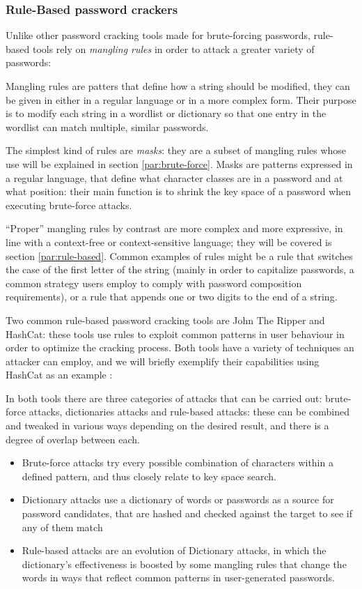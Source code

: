 \subsubsection{Rule-Based password crackers} \label{hash_and_jtr}
Unlike other password cracking tools made for brute-forcing passwords, rule-based tools rely on \emph{mangling rules} in order to attack a greater variety of passwords:

Mangling rules are patters that define how a string should be modified, they can be given in either in a regular language or in a more complex form.
Their purpose is to modify each string in a wordlist or dictionary so that one entry in the wordlist can match multiple, similar passwords.

The simplest kind of rules are \emph{masks}: they are a subset of mangling rules whose use will be explained in section \ref{par:brute-force}. Masks are patterns expressed in a regular language, that define what character classes are in a password and at what position: their main function is to shrink the key space of a password when executing brute-force attacks.

\enquote{Proper} mangling rules by contrast are more complex and more expressive, in line with a context-free or context-sensitive language; they will be covered is section \ref{par:rule-based}.
Common examples of rules might be a rule that switches the case of the first letter of the string (mainly in order to capitalize passwords, a common strategy users employ to comply with password composition requirements), or a rule that appends one or two digits to the end of a string. 

Two common rule-based password cracking tools are John The Ripper and \break \mbox{HashCat}\cite{john,hash_cat}: these tools use rules to exploit common patterns in user behaviour in order to optimize the cracking process. Both tools have a variety of techniques an attacker can employ, and we will briefly exemplify their capabilities using HashCat as an example \cite{hash_cat_wiki}:

In both tools there are three categories of attacks that can be carried out: brute-force attacks, dictionaries attacks and rule-based attacks: these can be combined and tweaked in various ways depending on the desired result, and there is a degree of overlap between each.


\begin{itemize}
\item Brute-force attacks try every possible combination of characters within a defined pattern, and thus closely relate to key space search. 
\item Dictionary attacks use a dictionary of words or passwords as a source for password candidates, that are hashed and checked against the target to see if any of them match
\item Rule-based attacks are an evolution of Dictionary attacks, in which the dictionary's effectiveness is boosted by some mangling rules that change the words in ways that reflect common patterns in user-generated passwords.
\end{itemize}

